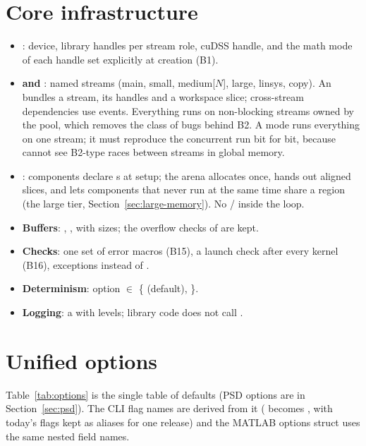 \documentclass[11pt]{article}
\begin{document}
\section{Core infrastructure}\label{sec:core}
\begin{itemize}
  \item \textbf{}: device, library handles per stream role, cuDSS handle, and the math mode of
  each handle set explicitly at creation (B1).
  \item \textbf{ and }: named streams (main, small, medium[$N$], large,
  linsys, copy). An  bundles a stream, its handles and a workspace slice; cross-stream
  dependencies use events. Everything runs on non-blocking streams owned by the pool, which removes the class
  of bugs behind B2. A  mode runs everything on one stream; it must reproduce the
  concurrent run bit for bit, because  cannot see B2-type races between
  streams in global memory.
  \item \textbf{}: components declare s at setup; the arena
  allocates once, hands out aligned slices, and lets components that never run at the same time share a
  region (the large tier, Section~\ref{sec:large-memory}). No / inside the loop.
  \item \textbf{Buffers}: , ,  with
   sizes; the overflow checks of  are kept.
  \item \textbf{Checks}: one set of error macros (B15), a launch check after every kernel (B16), exceptions
  instead of .
  \item \textbf{Determinism}: option  $\in$ \{ (default), \}.
  \item \textbf{Logging}: a  with levels; library code does not call .
\end{itemize}

\section{Unified options}\label{sec:options}
Table~\ref{tab:options} is the single table of defaults (PSD options are in Section~\ref{sec:psd}). The CLI flag
names are derived from it ( becomes , with today's flags kept as aliases for one
release) and the MATLAB options struct uses the same nested field names.
\end{document}

